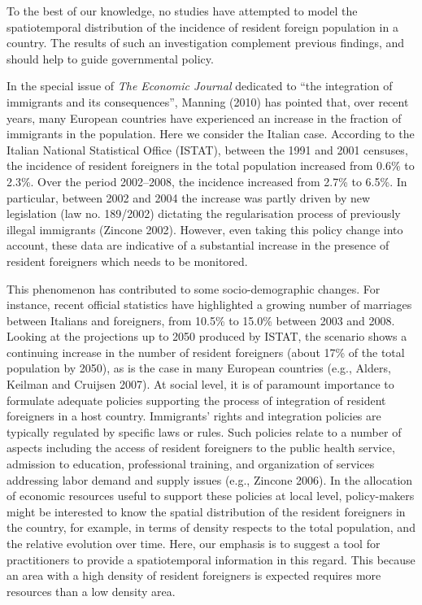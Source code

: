 \documentclass[10pt]{article}
\theoremstyle{definition}
\theoremstyle{plain}
\begin{document}
To the best of our knowledge, no studies have attempted to model the spatiotemporal distribution of the incidence of resident foreign population in a country. The results of such an investigation complement previous findings, and should help to guide governmental policy. 

In the special issue of \textit{The Economic Journal} dedicated to ``the integration of immigrants and its consequences'', Manning (2010) has pointed that, over recent years, many European countries have experienced an increase in the fraction of immigrants in the population. Here we consider the Italian case. According to the Italian National Statistical Office (ISTAT), between the 1991 and 2001 censuses, the incidence of resident foreigners in the total population increased from 0.6\% to 2.3\%. Over the period 2002--2008, the incidence increased from 2.7\% to 6.5\%. In particular, between 2002 and 2004 the increase was partly driven by new legislation (law no. 189/2002) dictating the regularisation process of previously illegal immigrants (Zincone 2002). However, even taking this policy change into account, these data are indicative of a substantial increase in the presence of resident foreigners which needs to be monitored. 

This phenomenon has contributed to some socio-demographic changes. For instance, recent official statistics have highlighted a growing number of marriages between Italians and foreigners, from 10.5\% to 15.0\% between 2003 and 2008. Looking at the projections up to 2050 produced by ISTAT, the scenario shows a continuing increase in the number of resident foreigners (about 17\% of the total population by 2050), as is the case in many European countries (e.g., Alders, Keilman and Cruijsen 2007). At social level, it is of paramount importance to formulate adequate policies supporting the process of integration of resident foreigners in a host country. Immigrants' rights and integration policies are typically regulated by specific laws or rules. Such policies relate to a number of aspects including the access of resident foreigners to the public health service, admission to education, professional training, and organization of services addressing labor demand and supply issues (e.g., Zincone 2006). In the allocation of economic resources useful to support these policies at local level, policy-makers might be interested to know the spatial distribution of the resident foreigners in the country, for example, in terms of density respects to the total population, and the relative evolution over time. Here, our emphasis is to suggest a tool for practitioners to provide a spatiotemporal information in this regard. This because an area with a high density of resident foreigners is expected requires more resources than a low density area.
\end{document}
